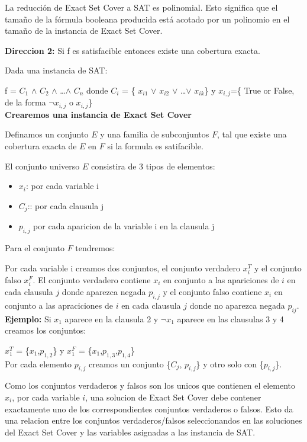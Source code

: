 \documentclass{article}
\begin{document}
La reducción de Exact Set Cover a SAT es polinomial. Esto significa que el tamaño de la fórmula booleana producida está acotado por un polinomio en el tamaño de la instancia de Exact Set Cover.

\textbf{Direccion 2:} Si f es satisfacible entonces existe una cobertura exacta.

Dada una instancia de SAT:

f = $C_1$ $\wedge$ $C_2$ $\wedge$ \dots $\wedge$ $C_n$
donde $C_i$ = \{ $x_{i1}$ $\vee$ $x_{i2}$ $\vee$ \dots $\vee$ $x_{ik}$\}
y \(x_{i,j}\)=\{ True or False, de la forma $\neg$$x_{i,j}$ o $x_{i,j}$\}\\

\textbf{Crearemos una instancia de Exact Set Cover}

Definamos un conjunto \(E\) y una familia de subconjuntos \(F\), tal que existe una cobertura exacta de \(E\) en \(F\) si la formula es satifacible.

El conjunto universo \(E\) consistira de 3 tipos de elementos:

\begin{itemize}
    \item $x_i$: por cada variable i
    \item $C_j$:: por cada clausula j
    \item $p_{i,j}$ por cada aparicion de la variable i en la clausula j
\end{itemize}

Para el conjunto \(F\) tendremos:

Por cada variable i creamos dos conjuntos, el conjunto verdadero $x_{i}^{T}$ y el conjunto falso $x_{i}^{F}$. El conjunto verdadero contiene $x_i$ en conjunto a las apariciones de \(i\) en cada clausula \(j\) donde aparezca negada $p_{i,j}$ y el conjunto falso contiene $x_i$ en conjunto a las apraciciones de \(i\) en cada clausula \(j\) donde no aparezca negada $p_{ij}$.\\

\textbf{Ejemplo:} Si $x_1$ aparece en la clausula 2 y $\neg$$x_1$ aparece en las clausulas 3 y 4 creamos los conjuntos:

$x_{1}^{T}$ = \{$x_1$,$p_{1,2}$\} y $x_{1}^{F}$ = \{$x_1$,$p_{1,3}$,$p_{1,4}$\}\\

Por cada elemento $p_{i,j}$ creamos un conjunto \{$C_j$, $p_{i,j}$\} y otro solo con \{$p_{i,j}$\}.

Como los conjuntos verdaderos y falsos son los unicos que contienen el elemento $x_i$, por cada variable $i$, una solucion de Exact Set Cover debe contener exactamente uno de los correspondientes conjuntos verdaderos o falsos. Esto da una relacion entre los conjuntos verdaderos/falsos seleccionandos en las soluciones del Exact Set Cover y las variables asignadas a las instancia de SAT.
\end{document}
